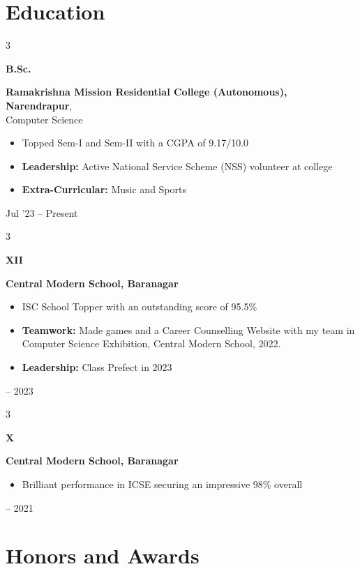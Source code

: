 \documentclass[10pt, letterpaper]{article}
\newenvironment{highlights}{
    \begin{itemize}[
        topsep=0.10 cm,
        parsep=0.10 cm,
        partopsep=0pt,
        itemsep=0pt,
        leftmargin=0.4 cm + 10pt
    ]
}{
    \end{itemize}
} %
\newenvironment{threecolentry}[3][]{
    \onecolentry
    \def\thirdColumn{#3}
    \setcolumnwidth{1 cm, \fill, 4.5 cm}
    \begin{paracol}{3}
    {\raggedright #2} \switchcolumn
}{
    \switchcolumn \raggedleft \thirdColumn
    \end{paracol}
    \endonecolentry
} %
\begin{document}
    \section{Education}
    
        \begin{threecolentry}{\textbf{B.Sc.}}{
            Jul '23 – Present
        }
            \textbf{Ramakrishna Mission Residential College (Autonomous), Narendrapur}, \\Computer Science
            \begin{highlights}
                \item Topped Sem-I and Sem-II with a CGPA of 9.17/10.0 
                \item \textbf{Leadership:} Active National Service Scheme (NSS) volunteer at college
                \item \textbf{Extra-Curricular:} Music and Sports 
            \end{highlights}
        \end{threecolentry}

        \begin{threecolentry}{\textbf{XII}}{
            2021 – 2023
        }
            \textbf{Central Modern School, Baranagar}
            \begin{highlights}
                \item ISC School Topper with an outstanding score of 95.5\% 
                \item \textbf{Teamwork:} Made games and a Career Counselling Website with my team in Computer Science Exhibition, Central Modern School, 2022.
                \item \textbf{Leadership:} Class Prefect in 2023
            \end{highlights}
        \end{threecolentry}

        \begin{threecolentry}{\textbf{X}}{
            2009 – 2021
        }
            \textbf{Central Modern School, Baranagar}
            \begin{highlights}
                \item Brilliant performance in ICSE securing an impressive 98\% overall 
            \end{highlights}
        \end{threecolentry}
        
    \section{Honors and Awards}
\end{document}
